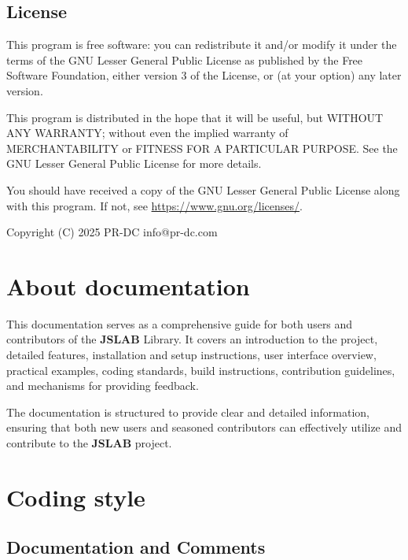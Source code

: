 \documentclass[12pt,a4paper]{article}
\newcommand{\yearvar}{2025}
\begin{document}
\subsection{License}
This program is free software: you can redistribute it and/or modify it under the terms of the GNU Lesser General Public License as published by the Free Software Foundation, either version 3 of the License, or (at your option) any later version.

This program is distributed in the hope that it will be useful, but WITHOUT ANY WARRANTY; without even the implied warranty of MERCHANTABILITY or FITNESS FOR A PARTICULAR PURPOSE. See the GNU Lesser General Public License for more details.

You should have received a copy of the GNU Lesser General Public License along with this program. If not, see \url{https://www.gnu.org/licenses/}.

\vspace{5mm}

Copyright (C) \yearvar\; PR-DC info@pr-dc.com

\vspace{8mm}

\section{About documentation}

This documentation serves as a comprehensive guide for both users and contributors of the \textbf{JSLAB} Library. It covers an introduction to the project, detailed features, installation and setup instructions, user interface overview, practical examples, coding standards, build instructions, contribution guidelines, and mechanisms for providing feedback.

The documentation is structured to provide clear and detailed information, ensuring that both new users and seasoned contributors can effectively utilize and contribute to the \textbf{JSLAB} project.

\section{Coding style}
\label{coding-style}

\subsection{Documentation and Comments}
\end{document}
